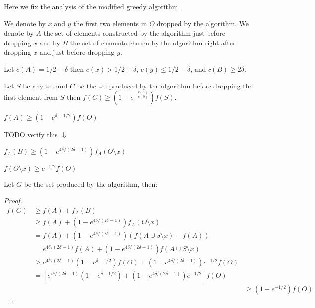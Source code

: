 Here we fix the analysis of the modified greedy algorithm.

We denote by $x$ and $y$ the first two elements in $O$ dropped by the algorithm.  
We denote by $A$ the set of elements constructed by the algorithm just before
dropping $x$ and by $B$ the set of elements chosen by the algorithm right after dropping $x$ 
and just before dropping $y$.

\begin{figure}[h]
\end{figure}

Let $c(A) = 1/2 - \delta$ 
then $c(x) > 1/2 + \delta$, $c(y) \leq 1/2 - \delta$, and $c(B) \geq 2\delta$.

\begin{lemma}
Let $S$ be any set and $C$ be the set produced by the algorithm 
before dropping the first element from $S$ then $f(C) \geq (1 - e^{-\frac{c(C)}{c(S)}})f(S)$.  
\end{lemma} 

\begin{observation}
$f(A) \geq (1 - e^{\delta - 1/2})f(O)$
\end{observation}

TODO verify this $\Downarrow$
\begin{observation}
$f_A(B) \geq (1 - e^{4\delta / (2\delta - 1)})f_A(O \setminus x)$
\end{observation}

\begin{observation}
$f(O \setminus x) \geq e^{-1/2}f(O)$
\end{observation}

Let $G$ be the set produced by the algorithm, then:
\begin{proof}
\def\arraystretch{1.5}
$$
\begin{array}{lll}
% 
f(G) & \geq f(A) + f_A(B)
\\& \geq f(A) + (1 - e^{4\delta / (2\delta - 1)})f_A(O \setminus x)
\\& = f(A) + (1 - e^{4\delta / (2\delta - 1)})(f(A \cup S \setminus x) - f(A))
\\& = e^{4\delta / (2\delta - 1)}f(A) 
	+ (1 - e^{4\delta / (2\delta - 1)})f(A \cup S \setminus x)
\\& \geq e^{4\delta / (2\delta - 1)}(1 - e^{\delta - 1/2})f(O)
	+ (1 - e^{4\delta / (2\delta - 1)})e^{-1/2}f(O)
\\& = [
		e^{4\delta / (2\delta - 1)}(1 - e^{\delta - 1/2}) + (1 - e^{4\delta / (2\delta - 1)})e^{-1/2}
		]f(O)
\\&& \geq (1-e^{-1/2})f(O)
% 
\end{array}
$$
\end{proof}